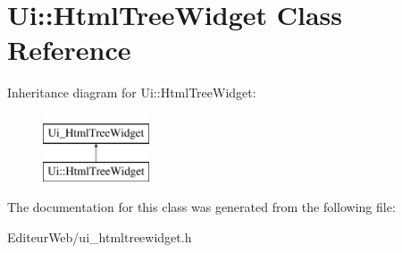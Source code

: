 \hypertarget{class_ui_1_1_html_tree_widget}{
\section{Ui::HtmlTreeWidget Class Reference}
\label{class_ui_1_1_html_tree_widget}
}
Inheritance diagram for Ui::HtmlTreeWidget:\begin{figure}[H]
\begin{center}
\leavevmode
\includegraphics[height=2.000000cm]{class_ui_1_1_html_tree_widget}
\end{center}
\end{figure}


The documentation for this class was generated from the following file:\begin{DoxyCompactItemize}
\item 
EditeurWeb/ui\_\-htmltreewidget.h\end{DoxyCompactItemize}

